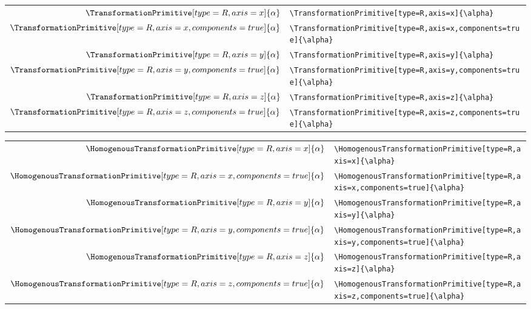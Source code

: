 \documentclass[10pt,a4paper]{article}
\begin{document}
\begin{tabular}{r|l}
$\TransformationPrimitive[type=R,axis=x]{\alpha}$ & \verb+\TransformationPrimitive[type=R,axis=x]{\alpha}+ \\
$\TransformationPrimitive[type=R,axis=x,components=true]{\alpha}$ & \verb+\TransformationPrimitive[type=R,axis=x,components=true]{\alpha}+ \\
$\TransformationPrimitive[type=R,axis=y]{\alpha}$ & \verb+\TransformationPrimitive[type=R,axis=y]{\alpha}+ \\
$\TransformationPrimitive[type=R,axis=y,components=true]{\alpha}$ & \verb+\TransformationPrimitive[type=R,axis=y,components=true]{\alpha}+ \\
$\TransformationPrimitive[type=R,axis=z]{\alpha}$ & \verb+\TransformationPrimitive[type=R,axis=z]{\alpha}+ \\
$\TransformationPrimitive[type=R,axis=z,components=true]{\alpha}$ & \verb+\TransformationPrimitive[type=R,axis=z,components=true]{\alpha}+ \\
\end{tabular}

\begin{tabular}{r|l}
$\HomogenousTransformationPrimitive[type=R,axis=x]{\alpha}$ & \verb+\HomogenousTransformationPrimitive[type=R,axis=x]{\alpha}+ \\
$\HomogenousTransformationPrimitive[type=R,axis=x,components=true]{\alpha}$ & \verb+\HomogenousTransformationPrimitive[type=R,axis=x,components=true]{\alpha}+ \\
$\HomogenousTransformationPrimitive[type=R,axis=y]{\alpha}$ & \verb+\HomogenousTransformationPrimitive[type=R,axis=y]{\alpha}+ \\
$\HomogenousTransformationPrimitive[type=R,axis=y,components=true]{\alpha}$ & \verb+\HomogenousTransformationPrimitive[type=R,axis=y,components=true]{\alpha}+ \\
$\HomogenousTransformationPrimitive[type=R,axis=z]{\alpha}$ & \verb+\HomogenousTransformationPrimitive[type=R,axis=z]{\alpha}+ \\
$\HomogenousTransformationPrimitive[type=R,axis=z,components=true]{\alpha}$ & \verb+\HomogenousTransformationPrimitive[type=R,axis=z,components=true]{\alpha}+ \\
\end{tabular}
\end{document}
